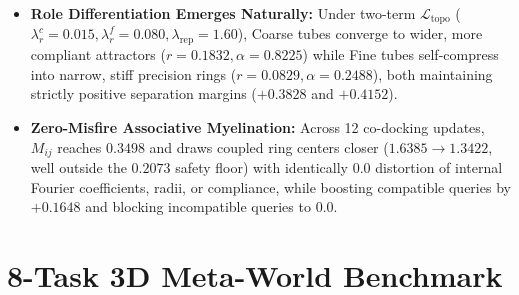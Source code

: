 \documentclass[10pt,twocolumn]{article}
\begin{document}
\begin{itemize}[leftmargin=*,itemsep=2pt]
  \item \textbf{Role Differentiation Emerges Naturally:} Under two-term $\mathcal{L}_{\text{topo}}$ ($\lambda_r^c=0.015, \lambda_r^f=0.080, \lambda_{\text{rep}}=1.60$), Coarse tubes converge to wider, more compliant attractors ($r=0.1832, \alpha=0.8225$) while Fine tubes self-compress into narrow, stiff precision rings ($r=0.0829, \alpha=0.2488$), both maintaining strictly positive separation margins ($+0.3828$ and $+0.4152$).
  \item \textbf{Zero-Misfire Associative Myelination:} Across 12 co-docking updates, $M_{ij}$ reaches $0.3498$ and draws coupled ring centers closer ($1.6385 \to 1.3422$, well outside the $0.2073$ safety floor) with identically $0.0$ distortion of internal Fourier coefficients, radii, or compliance, while boosting compatible queries by $+0.1648$ and blocking incompatible queries to $0.0$.
\end{itemize}

\section{8-Task 3D Meta-World Benchmark}
\end{document}
